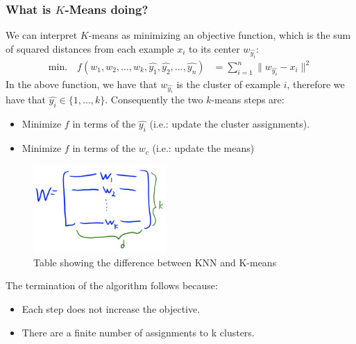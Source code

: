 \documentclass{article}
\def\gre#1{{\color{gre}#1}}
\def\norm#1{\|#1\|}
\theoremstyle{definition}
\begin{document}
\subsubsection*{What is $ K $-Means doing?}
We can interpret $ K $-means as minimizing an objective function, which is \gre{the sum of squared distances from each example $ x_i $ to its center $ w_{\hat{y_i}} $}:
\begin{align*}
\text{min.} \quad f(w_1, w_2, ..., w_k, \hat{y_1}, \hat{y_2}, ..., \hat{y_n}) &= \sum_{i = 1}^{n} \norm{w_{\hat{y_i}} - x_i}^2 
\end{align*}
In the above function, we have that $ w_{\hat{y_i}} $ is the cluster of example $ i $, therefore we have that $ \hat{y_i} \in \{1, ..., k\} $. Consequently the two $ k $-means steps are:
\begin{itemize}
	\item \gre{Minimize $ f $ in terms of the $ \hat{y_i} $} (i.e.: update the cluster assignments).
	\item \gre{Minimize $ f $ in terms of the $ w_c $} (i.e.: update the means)
\end{itemize}
\begin{figure}[H]
	\centering
	\includegraphics[width = 2in]{Pic10}
	\caption{Table showing the difference between KNN and K-means}
\end{figure}


The termination of the algorithm follows because:
\begin{itemize}
	\item Each step does not increase the objective.
	\item There are a finite number of assignments to k clusters.
\end{itemize}
\end{document}
